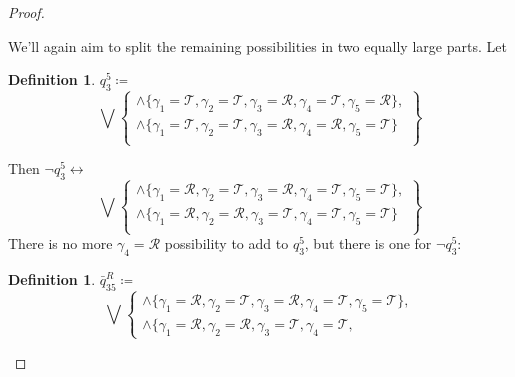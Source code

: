 \documentclass[twoside,twocolumn,a4paper,11pt]{article}
\theoremstyle{definition}
\newtheorem{defn}[theorem]{Definition}
\begin{document}
\begin{proof}
\begin{description}[itemsep=2pt,topsep=3pt,leftmargin=0.6em]
\begin{description}[itemsep=2pt,topsep=1pt,leftmargin=0.6em]
We'll again aim to split the remaining possibilities in two equally large parts.
Let
\begin{defn}%
\label{def:q35}
$q_{3}^5 \coloneqq$
\begin{equation}
\label{eq:q35}
\bigvee\!\!
 \left\lbrace\!
  \begin{matrix}
   \land\{\gamma_1=\mathcal{T},\gamma_2=\mathcal{T},\gamma_3=\mathcal{R},\gamma_4=\mathcal{T},
   \gamma_5=\mathcal{R}\},\\
   \land\{\gamma_1=\mathcal{T},\gamma_2=\mathcal{T},\gamma_3=\mathcal{R},\gamma_4=\mathcal{R},
   \gamma_5=\mathcal{T}\}\;\\
  \end{matrix}\!
 \right\rbrace\!\!\!
\end{equation}
\end{defn}
Then $\neg q_{3}^5 \leftrightarrow$
\begin{equation}
\label{eq:notq35}
\bigvee\!\!
 \left\lbrace\!
  \begin{matrix}
   \land\{\gamma_1=\mathcal{R},\gamma_2=\mathcal{T},\gamma_3=\mathcal{R},\gamma_4=\mathcal{T},
   \gamma_5=\mathcal{T}\},\\
   \land\{\gamma_1=\mathcal{R},\gamma_2=\mathcal{R},\gamma_3=\mathcal{T},\gamma_4=\mathcal{T},
   \gamma_5=\mathcal{T}\}\;\\
  \end{matrix}\!
 \right\rbrace\!\!\!
\end{equation}
There is no more $\gamma_4=\mathcal{R}$ possibility to add to $q_3^5$,
but there is one for $\neg q_3^5$:
\begin{defn}%
\label{def:notq35R}
$\bar{q}_{35}^R \coloneqq$
\begin{equation}
\label{eq:notq35R}
\bigvee\!\!
 \left\lbrace\!
  \begin{matrix}
   \land\{\gamma_1=\mathcal{R},\gamma_2=\mathcal{T},\gamma_3=\mathcal{R},\gamma_4=\mathcal{T},
   \gamma_5=\mathcal{T}\},\\
   \land\{\gamma_1=\mathcal{R},\gamma_2=\mathcal{R},\gamma_3=\mathcal{T},\gamma_4=\mathcal{T},

\end{matrix}
\end{equation}
\end{defn}
\end{description}
\end{description}
\end{proof}
\end{document}
